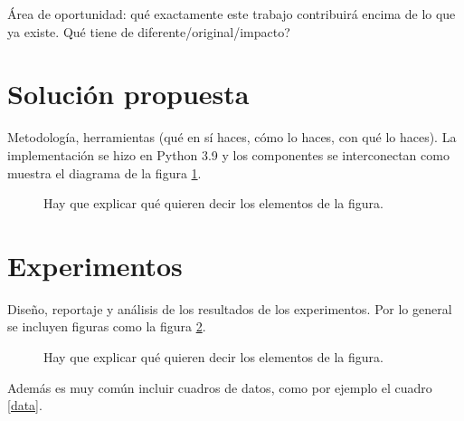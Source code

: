 \documentclass[a4]{sciposter}
\begin{document}
\begin{multicols}{2}
Área de oportunidad: qué exactamente este trabajo contribuirá encima
de lo que ya existe.  {\textquestiondown}Qué tiene de
diferente/original/impacto?

\section{Solución propuesta}

Metodología, herramientas (qué en sí haces, cómo lo haces, con qué lo
haces).  La implementación se hizo en Python 3.9 \citep{python} y los
componentes se interconectan como muestra el diagrama de la figura
\ref{diag}.

\begin{figure}
\captionsetup{type=figure} %
\setcounter{figure}{0} %
\begin{center}
\end{center}
\caption{Hay que explicar qué quieren decir los elementos de la figura.}
\label{diag}
\end{figure}

\section{Experimentos}

Diseño, reportaje y análisis de los resultados de los
experimentos. Por lo general se incluyen figuras como la figura
\ref{curvas}.

\begin{figure}
\setcounter{figure}{1} 
\captionsetup{type=figure} %
\begin{center}
   \end{center}
    \caption{Hay que explicar qué quieren decir los elementos de la figura.}
    \label{curvas}
\end{figure}

Además es muy común incluir cuadros de datos, como por ejemplo el cuadro \ref{data}.


\end{multicols}
\end{document}

